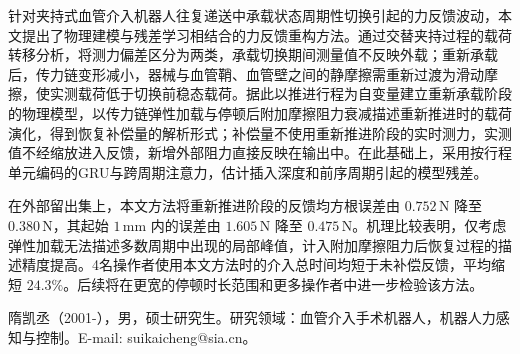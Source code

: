 \documentclass{JQR_LaTeX_Template-0507/JQRnewSubmission}
\begin{document}
针对夹持式血管介入机器人往复递送中承载状态周期性切换引起的力反馈波动，本文提出了物理建模与残差学习相结合的力反馈重构方法。通过交替夹持过程的载荷转移分析，将测力偏差区分为两类，承载切换期间测量值不反映外载；重新承载后，传力链变形减小，器械与血管鞘、血管壁之间的静摩擦需重新过渡为滑动摩擦，使实测载荷低于切换前稳态载荷。据此以推进行程为自变量建立重新承载阶段的物理模型，以传力链弹性加载与停顿后附加摩擦阻力衰减描述重新推进时的载荷演化，得到恢复补偿量的解析形式；补偿量不使用重新推进阶段的实时测力，实测值不经缩放进入反馈，新增外部阻力直接反映在输出中。在此基础上，采用按行程单元编码的GRU与跨周期注意力，估计插入深度和前序周期引起的模型残差。

在外部留出集上，本文方法将重新推进阶段的反馈均方根误差由 $0.752\,\mathrm{N}$ 降至 $0.380\,\mathrm{N}$，其起始 $1\,\mathrm{mm}$ 内的误差由 $1.605\,\mathrm{N}$ 降至 $0.475\,\mathrm{N}$。机理比较表明，仅考虑弹性加载无法描述多数周期中出现的局部峰值，计入附加摩擦阻力后恢复过程的描述精度提高。4名操作者使用本文方法时的介入总时间均短于未补偿反馈，平均缩短 $24.3\%$。后续将在更宽的停顿时长范围和更多操作者中进一步检验该方法。



\noindent




\begin{AuthorIntroduction}
\Intro 隋凯丞（2001-），男，硕士研究生。研究领域：血管介入手术机器人，机器人力感知与控制。E-mail: suikaicheng@sia.cn。


\end{AuthorIntroduction}

\balance
\end{document}
